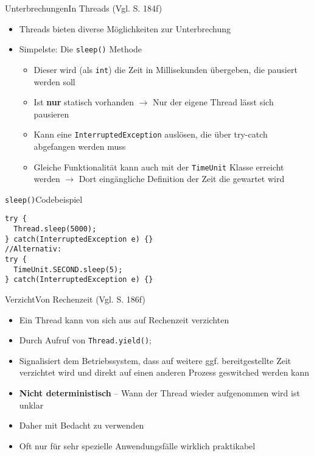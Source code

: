 \begin{frame}{Unterbrechungen}{In Threads (Vgl. \cite{ullenboom2014java} S. 184f)}
    \begin{itemize}
        \item Threads bieten diverse Möglichkeiten zur Unterbrechung
        \item Simpelste: Die \texttt{sleep()} Methode
        \begin{itemize}
            \item Dieser wird (als \texttt{int}) die Zeit in Millisekunden übergeben, die pausiert werden soll
            \item Ist \textbf{nur} statisch vorhanden $\rightarrow$ Nur der eigene Thread lässt sich pausieren
            \item Kann eine \texttt{InterruptedException} auslösen, die über try-catch abgefangen werden muss
            \item Gleiche Funktionalität kann auch mit der \texttt{TimeUnit} Klasse erreicht werden $\rightarrow$ Dort eingängliche Definition der Zeit die gewartet wird
        \end{itemize}
    \end{itemize}
\end{frame}

\begin{frame}[fragile]{\texttt{sleep()}}{Codebeispiel}
\lstset{style=java}
\begin{lstlisting}
try {
  Thread.sleep(5000);
} catch(InterruptedException e) {}
//Alternativ:
try {
  TimeUnit.SECOND.sleep(5);
} catch(InterruptedException e) {}
\end{lstlisting}
\end{frame}

\begin{frame}{Verzicht}{Von Rechenzeit (Vgl. \cite{ullenboom2014java} S. 186f)} 
    \begin{itemize}
        \item Ein Thread kann von sich aus auf Rechenzeit verzichten
        \item Durch Aufruf von \texttt{Thread.yield()};
        \item Signalisiert dem Betriebssystem, dass auf weitere ggf. bereitgestellte Zeit verzichtet wird und direkt auf einen anderen Prozess geswitched werden kann
        \item \textbf{Nicht deterministisch} -- Wann der Thread wieder aufgenommen wird ist unklar
        \item Daher mit Bedacht zu verwenden
        \item Oft nur für sehr spezielle Anwendungsfälle wirklich praktikabel
    \end{itemize}
\end{frame}

